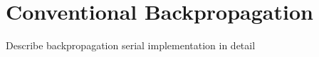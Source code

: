 \section{Conventional Backpropagation}
\label{BackProp}

Describe backpropagation serial implementation in detail